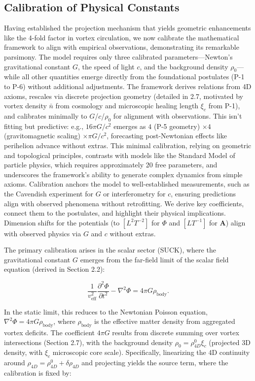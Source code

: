 \subsection{Calibration of Physical Constants}

Having established the projection mechanism that yields geometric enhancements like the 4-fold factor in vortex circulation, we now calibrate the mathematical framework to align with empirical observations, demonstrating its remarkable parsimony. The model requires only three calibrated parameters---Newton's gravitational constant $G$, the speed of light $c$, and the background density $\rho_0$---while all other quantities emerge directly from the foundational postulates (P-1 to P-6) without additional adjustments. The framework derives relations from 4D axioms, rescales via discrete projection geometry (detailed in 2.7, motivated by vortex density $\bar{n}$ from cosmology and microscopic healing length $\xi_c$ from P-1), and calibrates minimally to $G$/$c$/$\rho_0$ for alignment with observations. This isn't fitting but predictive: e.g., $16\pi G/c^2$ emerges as $4$ (P-5 geometry) $\times 4$ (gravitomagnetic scaling) $\times \pi G/c^2$, forecasting post-Newtonian effects like perihelion advance without extras. This minimal calibration, relying on geometric and topological principles, contrasts with models like the Standard Model of particle physics, which requires approximately 20 free parameters, and underscores the framework's ability to generate complex dynamics from simple axioms. Calibration anchors the model to well-established measurements, such as the Cavendish experiment for $G$ or interferometry for $c$, ensuring predictions align with observed phenomena without retrofitting. We derive key coefficients, connect them to the postulates, and highlight their physical implications. Dimension shifts for the potentials (to $[L^2 T^{-2}]$ for $\Phi$ and $[L T^{-1}]$ for $\mathbf{A}$) align with observed physics via $G$ and $c$ without extras.

The primary calibration arises in the scalar sector (SUCK), where the gravitational constant $G$ emerges from the far-field limit of the scalar field equation (derived in Section 2.2):

\begin{equation}
\frac{1}{v_{\text{eff}}^2} \frac{\partial^2 \Phi}{\partial t^2} - \nabla^2 \Phi = 4\pi G \rho_{\text{body}}.
\end{equation}

In the static limit, this reduces to the Newtonian Poisson equation, $\nabla^2 \Phi = 4\pi G \rho_{\text{body}}$, where $\rho_{\text{body}}$ is the effective matter density from aggregated vortex deficits. The coefficient $4\pi G$ results from discrete summing over vortex intersections (Section 2.7), with the background density $\rho_0 = \rho_{4D}^0 \xi_c$ (projected 3D density, with $\xi_c$ microscopic core scale). Specifically, linearizing the 4D continuity around $\rho_{4D} = \rho_{4D}^0 + \delta \rho_{4D}$ and projecting yields the source term, where the calibration is fixed by:

